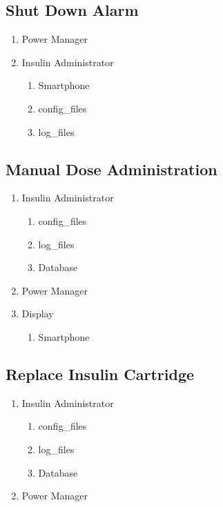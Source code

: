 \documentclass{scrreprt}
\begin{document}
\subsection{Shut Down Alarm}
\begin{enumerate}
    \item Power Manager 
    \item Insulin Administrator
        \begin{enumerate}
            \item Smartphone
            \item config\_files
            \item log\_files
        \end{enumerate}
\end{enumerate}

\subsection{Manual Dose Administration}
\begin{enumerate}
    \item Insulin Administrator
        \begin{enumerate}
            \item config\_files
            \item log\_files
            \item Database
        \end{enumerate}
    \item Power Manager
    \item Display
        \begin{enumerate}
            \item Smartphone
        \end{enumerate}
\end{enumerate}

\subsection{Replace Insulin Cartridge}
\begin{enumerate}
    \item Insulin Administrator 
        \begin{enumerate}
            \item config\_files
            \item log\_files
            \item Database
        \end{enumerate}
    \item Power Manager
\end{enumerate}
\end{document}
